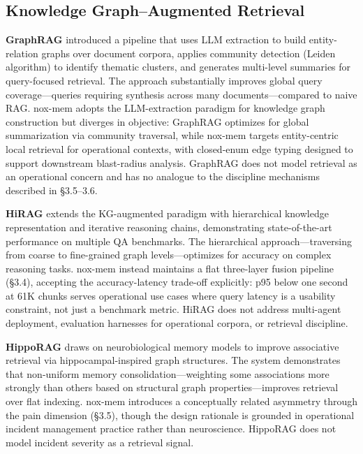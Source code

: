 \subsection{Knowledge Graph--Augmented Retrieval}

\textbf{GraphRAG} \cite{edge2024graphrag} introduced a pipeline that uses LLM extraction
to build entity-relation graphs over document corpora, applies community detection (Leiden
algorithm) to identify thematic clusters, and generates multi-level summaries for
query-focused retrieval. The approach substantially improves global query coverage---queries
requiring synthesis across many documents---compared to naive RAG. nox-mem adopts the
LLM-extraction paradigm for knowledge graph construction but diverges in objective:
GraphRAG optimizes for global summarization via community traversal, while nox-mem targets
entity-centric local retrieval for operational contexts, with closed-enum edge typing
designed to support downstream blast-radius analysis. GraphRAG does not model retrieval as
an operational concern and has no analogue to the discipline mechanisms described in
\S3.5--3.6.

\textbf{HiRAG} \cite{huang2025hirag} extends the KG-augmented paradigm with hierarchical
knowledge representation and iterative reasoning chains, demonstrating state-of-the-art
performance on multiple QA benchmarks. The hierarchical approach---traversing from coarse to
fine-grained graph levels---optimizes for accuracy on complex reasoning tasks. nox-mem
instead maintains a flat three-layer fusion pipeline (\S3.4), accepting the
accuracy-latency trade-off explicitly: p95 below one second at 61K chunks serves
operational use cases where query latency is a usability constraint, not just a benchmark
metric. HiRAG does not address multi-agent deployment, evaluation harnesses for operational
corpora, or retrieval discipline.

\textbf{HippoRAG} \cite{guo2024hipporag} draws on neurobiological memory models to improve
associative retrieval via hippocampal-inspired graph structures. The system demonstrates
that non-uniform memory consolidation---weighting some associations more strongly than
others based on structural graph properties---improves retrieval over flat indexing. nox-mem
introduces a conceptually related asymmetry through the pain dimension (\S3.5), though the
design rationale is grounded in operational incident management practice rather than
neuroscience. HippoRAG does not model incident severity as a retrieval signal.

